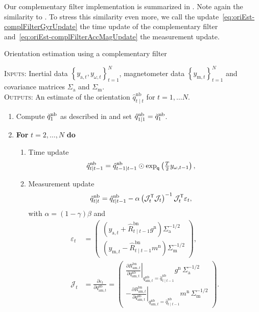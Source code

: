 Our complementary filter implementation is summarized in . Note again the similarity to . To stress this similarity even more, we call the update~\eqref{eq:oriEst-complFilterGyrUpdate} the time update of the complementary filter and~\eqref{eq:oriEst-complFilterAccMagUpdate} the measurement update. 

\begin{algorithm}[ht]
\caption{\textsf{Orientation estimation using a complementary filter}}
\label{alg:oriEst-compl}
\small
\textsc{Inputs:} Inertial data $\left\{ y_{\text{a},t}, y_{\omega,t} \right\}_{t=1}^N$, magnetometer data $\left\{ y_{\text{m},t}\right\}_{t=1}^N$ and covariance matrices $\Sigma_\text{a}$ and $\Sigma_\text{m}$. \\
\textsc{Outputs:} An estimate of the orientation $\hat{q}^\text{nb}_{t \mid t}$ for $t = 1, \hdots N$.
\algrule[.4pt]
\begin{enumerate}
\item Compute $\breve{q}^\text{nb}_{1}$ as described in  and set $\hat{q}_{1 \mid 1}^\text{nb} = \breve{q}_{1}^\text{nb}$.
\item \textbf{For} $t = 2, \hdots, N$ \textbf{do}
\begin{enumerate}
\item Time update
\begin{align}
\hat{q}^\text{nb}_{t \mid t-1} &= \hat{q}^\text{nb}_{t-1 \mid t-1} \odot \expq \left( \tfrac{T}{2} y_{\omega,t-1} \right), 
\label{eq:ori_compl_timeUpdate}%
\end{align}%
\item Measurement update
\begin{align}
\tilde{q}^\text{nb}_{t \mid t} &= \hat{q}_{t \mid t-1}^\text{nb} - \alpha \left( \mathcal{J}_t^{\mathsf{T}} \mathcal{J}_t \right)^{-1} \mathcal{J}_t^{\mathsf{T}} \varepsilon_t, 
\label{eq:ori_compl_measUpdate}
\end{align}
with $\alpha = ( 1 - \gamma ) \beta$ and
\begin{align*}
\varepsilon_t &= \begin{pmatrix} \left( y_{\text{a},t} + \hat{R}^\text{bn}_{t \mid t-1} g^\text{n} \right) \Sigma_\text{a}^{-1/2} \\ \left( y_{\text{m},t} - \hat{R}^\text{bn}_{t \mid t-1} m^\text{n} \right) \Sigma_\text{m}^{-1/2} \end{pmatrix}, \\
\mathcal{J}_t &= \tfrac{\partial \varepsilon_t}{\partial q_{\text{am},t}^\text{nb}} = \begin{pmatrix} \left. \tfrac{\partial R_{\text{am},t}^\text{bn}}{\partial q_{\text{am},t}^\text{nb}} \right|_{q_{\text{am},t}^\text{nb}=\hat{q}^\text{nb}_{t \mid t-1}} g^\text{n} \, \Sigma_\text{a}^{-1/2} \\ \left. - \tfrac{\partial R_{\text{am},t}^\text{bn}}{\partial q_{\text{am},t}^\text{nb}} \right|_{q_{\text{am},t}^\text{nb}=\hat{q}^\text{nb}_{t \mid t-1}} m^\text{n} \, \Sigma_\text{m}^{-1/2} \end{pmatrix}.

\end{align*}
\end{enumerate}
\end{enumerate}
\end{algorithm}

